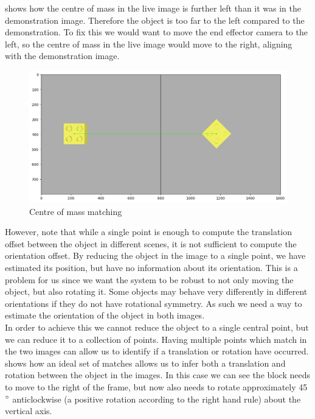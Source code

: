  shows how the centre of mass in the live image is further left than it was in the demonstration image. Therefore the object is too far to the left compared to the demonstration. To fix this we would want to move the end effector camera to the left, so the centre of mass in the live image would move to the right, aligning with the demonstration image.

\begin{figure}[h]
    \centering
    \includegraphics[width=\textwidth]{figures/ideal_centre-of-mass.png}
    \caption{Centre of mass matching}
    \label{fig:centre-of-mass}
\end{figure}

However, note that while a single point is enough to compute the translation offset between the object in different scenes, it is not sufficient to compute the orientation offset. By reducing the object in the image to a single point, we have estimated its position, but have no information about its orientation. This is a problem for us since we want the system to be robust to not only moving the object, but also rotating it. Some objects may behave very differently in different orientations if they do not have rotational symmetry. As such we need a way to estimate the orientation of the object in both images.\\

In order to achieve this we cannot reduce the object to a single central point, but we can reduce it to a collection of points. Having multiple points which match in the two images can allow us to identify if a translation or rotation have occurred.  shows how an ideal set of matches allows us to infer both a translation and rotation between the object in the images. In this case we can see the block needs to move to the right of the frame, but now also needs to rotate approximately 45$\operatorname{^{\circ}}$ anticlockwise (a positive rotation according to the right hand rule) about the vertical axis.\\

